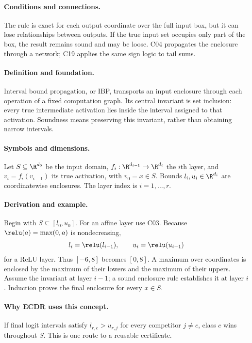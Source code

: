 \paragraph{Conditions and connections.}
The rule is exact for each output coordinate over the full input box, but it can lose relationships between outputs. If the true input set occupies only part of the box, the result remains sound and may be loose. C04 propagates the enclosure through a network; C19 applies the same sign logic to tail sums.

\paragraph{Definition and foundation.}
Interval bound propagation, or IBP, transports an input enclosure through each operation of a fixed computation graph. Its central invariant is set inclusion: every true intermediate activation lies inside the interval assigned to that activation. Soundness means preserving this invariant, rather than obtaining narrow intervals.
\paragraph{Symbols and dimensions.}
Let $S\subseteq\R^{d_0}$ be the input domain, $f_i:\R^{d_{i-1}}\to\R^{d_i}$ the $i$th layer, and $v_i=f_i(v_{i-1})$ its true activation, with $v_0=x\in S$. Bounds $l_i,u_i\in\R^{d_i}$ are coordinatewise enclosures. The layer index is $i=1,\ldots,r$.
\paragraph{Derivation and example.}
Begin with $S\subseteq[l_0,u_0]$. For an affine layer use C03. Because $\relu(a)=\max(0,a)$ is nondecreasing,
\[
 l_i=\relu(l_{i-1}),\qquad u_i=\relu(u_{i-1})
\]
for a ReLU layer. Thus $[-6,8]$ becomes $[0,8]$. A maximum over coordinates is enclosed by the maximum of their lowers and the maximum of their uppers. Assume the invariant at layer $i-1$; a sound enclosure rule establishes it at layer $i$. Induction proves the final enclosure for every $x\in S$.
\paragraph{Why ECDR uses this concept.}
If final logit intervals satisfy $l_{r,c}>u_{r,j}$ for every competitor $j\ne c$, class $c$ wins throughout $S$. This is one route to a reusable certificate.
